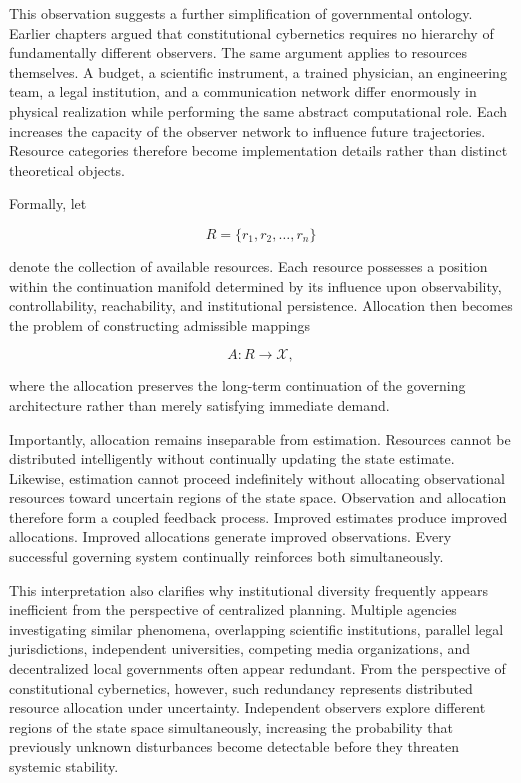 \documentclass[12pt,a4paper]{article}
\begin{document}
This observation suggests a further simplification of governmental ontology. Earlier chapters argued that constitutional cybernetics requires no hierarchy of fundamentally different observers. The same argument applies to resources themselves. A budget, a scientific instrument, a trained physician, an engineering team, a legal institution, and a communication network differ enormously in physical realization while performing the same abstract computational role. Each increases the capacity of the observer network to influence future trajectories. Resource categories therefore become implementation details rather than distinct theoretical objects.

Formally, let

\[
R=\{r_1,r_2,\ldots,r_n\}
\]

denote the collection of available resources. Each resource possesses a position within the continuation manifold determined by its influence upon observability, controllability, reachability, and institutional persistence. Allocation then becomes the problem of constructing admissible mappings

\[
A:R\rightarrow\mathcal{X},
\]

where the allocation preserves the long-term continuation of the governing architecture rather than merely satisfying immediate demand.

Importantly, allocation remains inseparable from estimation. Resources cannot be distributed intelligently without continually updating the state estimate. Likewise, estimation cannot proceed indefinitely without allocating observational resources toward uncertain regions of the state space. Observation and allocation therefore form a coupled feedback process. Improved estimates produce improved allocations. Improved allocations generate improved observations. Every successful governing system continually reinforces both simultaneously.

This interpretation also clarifies why institutional diversity frequently appears inefficient from the perspective of centralized planning. Multiple agencies investigating similar phenomena, overlapping scientific institutions, parallel legal jurisdictions, independent universities, competing media organizations, and decentralized local governments often appear redundant. From the perspective of constitutional cybernetics, however, such redundancy represents distributed resource allocation under uncertainty. Independent observers explore different regions of the state space simultaneously, increasing the probability that previously unknown disturbances become detectable before they threaten systemic stability.
\end{document}
